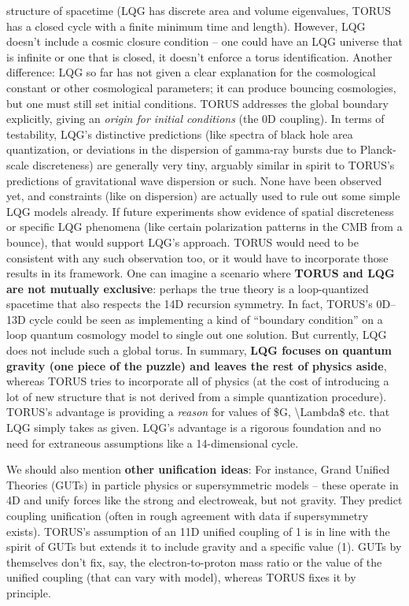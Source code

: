 \documentclass[]{article}
\begin{document}
\begin{itemize}
  structure of spacetime (LQG has discrete area and volume eigenvalues,
  TORUS has a closed cycle with a finite minimum time and length).
  However, LQG doesn't include a cosmic closure condition -- one could
  have an LQG universe that is infinite or one that is closed, it
  doesn't enforce a torus identification. Another difference: LQG so far
  has not given a clear explanation for the cosmological constant or
  other cosmological parameters; it can produce bouncing cosmologies,
  but one must still set initial conditions. TORUS addresses the global
  boundary explicitly, giving an \emph{origin for initial conditions}
  (the 0D coupling). In terms of testability, LQG's distinctive
  predictions (like spectra of black hole area quantization, or
  deviations in the dispersion of gamma-ray bursts due to Planck-scale
  discreteness) are generally very tiny, arguably similar in spirit to
  TORUS's predictions of gravitational wave dispersion or such. None
  have been observed yet, and constraints (like on dispersion) are
  actually used to rule out some simple LQG models already. If future
  experiments show evidence of spatial discreteness or specific LQG
  phenomena (like certain polarization patterns in the CMB from a
  bounce), that would support LQG's approach. TORUS would need to be
  consistent with any such observation too, or it would have to
  incorporate those results in its framework. One can imagine a scenario
  where \textbf{TORUS and LQG are not mutually exclusive}: perhaps the
  true theory is a loop-quantized spacetime that also respects the 14D
  recursion symmetry. In fact, TORUS's 0D--13D cycle could be seen as
  implementing a kind of ``boundary condition'' on a loop quantum
  cosmology model to single out one solution. But currently, LQG does
  not include such a global torus. In summary, \textbf{LQG focuses on
  quantum gravity (one piece of the puzzle) and leaves the rest of
  physics aside}, whereas TORUS tries to incorporate all of physics (at
  the cost of introducing a lot of new structure that is not derived
  from a simple quantization procedure). TORUS's advantage is providing
  a \emph{reason} for values of \$G, \textbackslash{}Lambda\$ etc. that
  LQG simply takes as given. LQG's advantage is a rigorous foundation
  and no need for extraneous assumptions like a 14-dimensional cycle.
\end{itemize}

We should also mention \textbf{other unification ideas}: For instance,
Grand Unified Theories (GUTs) in particle physics or supersymmetric
models -- these operate in 4D and unify forces like the strong and
electroweak, but not gravity. They predict coupling unification (often
in rough agreement with data if supersymmetry exists). TORUS's
assumption of an 11D unified coupling of 1 is in line with the spirit of
GUTs but extends it to include gravity and a specific value (1). GUTs by
themselves don't fix, say, the electron-to-proton mass ratio or the
value of the unified coupling (that can vary with model), whereas TORUS
fixes it by principle.
\end{document}
